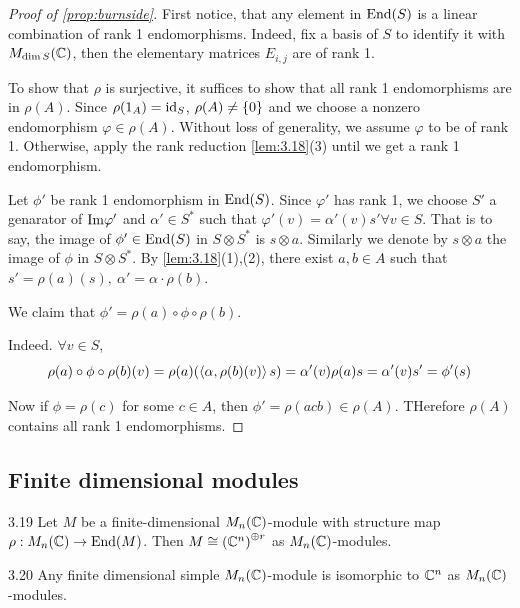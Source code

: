 \documentclass[twoside = false,	%
		headsepline,		%
		parskip = true,
		]{scrbook}						%
\begin{document}
    \begin{proof}[Proof of \ref{prop:burnside}]
        First notice, that any element in $\mathrm{End}(S)$ is a linear combination of rank 1 endomorphisms. Indeed, fix a basis of $S$ to identify it with $M_{\dim S}(\mathbb C)$, then the elementary matrices $E_{i,j}$ are of rank 1.

        To show that $\rho$ is surjective, it suffices to show that all rank 1 endomorphisms are in $\rho(A)$.
        Since $\rho(1_A)=\mathrm{id}_S$, $\rho(A)\neq\left\{ 0\right\}$ and we choose a nonzero endomorphism $\varphi\in\rho(A)$. Without loss of generality, we assume $\varphi$ to be of rank 1. Otherwise, apply the rank reduction \ref{lem:3.18}(3) until we get a rank 1 endomorphism.

        Let $\phi'$ be rank 1 endomorphism in $\mathrm{End}(S)$. Since $\varphi'$ has rank 1, we choose $S'$ a genarator of $\mathrm{Im} \varphi'$ and $\alpha'\in S^*$ such that $\varphi'(v) = \alpha'(v)s' \forall v\in S$. That is to say, the image of $\phi'\in\mathrm{End}(S)$ in $S\otimes S^*$ is $s\otimes a$. Similarly we denote by $s\otimes a$ the image of $\phi$ in $S\otimes S^*$. By \ref{lem:3.18}(1),(2), there exist $a,b \in A$ such that $s'=\rho(a)(s), \ \alpha'=\alpha \cdot \rho(b)$.

        We claim that $\phi'=\rho(a)\circ \phi \circ \rho(b)$.

        Indeed. $\forall v \in S$, $$\rho(a)\circ \phi \circ \rho(b)(v) = \rho(a)(\left\langle \alpha, \rho(b)(v)\right\rangle s) = \alpha'(v)\rho(a)s = \alpha'(v)s' = \phi'(s)$$

        Now if $\phi=\rho(c)$ for some $c\in A$, then $\phi'=\rho(acb)\in \rho(A)$. THerefore $\rho(A)$ contains all rank 1 endomorphisms.
    \end{proof}

    \subsection{Finite dimensional modules}

    \begin{proposition}{}{3.19}
        Let $M$ be a finite-dimensional $M_n(\mathbb C)$-module with structure map $\rho: M_n(\mathbb C) \to \mathrm{End}(M)$. Then $M \cong \left( \mathbb C^n\right)^{\oplus r}$ as $M_n(\mathbb C)$-modules.
    \end{proposition}
    
    \begin{corollary}{}{3.20}
        Any finite dimensional simple $M_n(\mathbb C)$-module is isomorphic to $\mathbb C^n$ as $M_n(\mathbb C)$-modules.
    \end{corollary}
    
\end{document}
